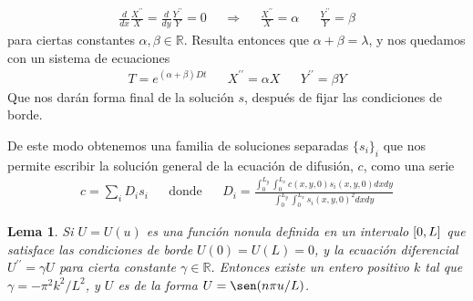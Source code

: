 \documentclass{article}
\newcommand{\realNumbers}{\mathbb{R}}
\newcommand{\leftOpenInterval}{\left]}
\newcommand{\rightOpenInterval}{\right[}
\newcommand{\leftClosedInterval}{\left[}
\newcommand{\rightClosedInterval}{\right]}
\newcommand{\interval}[3]{%
  \ifstrequal{#1}{oo}{%
    \leftOpenInterval #2, #3 \rightOpenInterval%
  }{%
    \ifstrequal{#1}{co}{%
      \leftClosedInterval #2, #3 \rightOpenInterval%
    }{%
      \ifstrequal{#1}{oc}{
        \leftOpenInterval #2, #3 \rightClosedInterval%
      }{%
        \ifstrequal{#1}{cc}{
          \leftClosedInterval #2, #3 \rightClosedInterval
        }{%
        }%
      }%
    }%
  }%
}
\newtheorem{lemma}{Lema}
\begin{document}
  \begin{align}
    \frac{d}{d x} \frac{X^{\prime\prime}}{X} 
    =
    \frac{d}{d y} \frac{Y^{\prime\prime}}{Y}
    =
    0
    &&\Rightarrow
    &&\frac{X^{\prime\prime}}{X} = \alpha
    &&\frac{Y^{\prime\prime}}{Y} = \beta
  \end{align}
  para ciertas constantes \(\alpha, \beta \in \realNumbers\).
  Resulta entonces que \(\alpha + \beta = \lambda\), y nos quedamos con un sistema de ecuaciones
  \begin{align}
    \label{equation:separatedDifussionEquation}
    T = e^{(\alpha + \beta) D t}
    && X^{\prime\prime} = \alpha X
    && Y^{\prime\prime} = \beta Y
  \end{align}
  Que nos darán forma final de la solución \(s\), después de fijar las condiciones de borde.

  De este modo obtenemos una familia de soluciones separadas \(\{s_i\}_i\) que nos permite escribir la solución general de la ecuación de difusión, \(c\), como una serie
  \begin{align}
    c = \sum_i D_i s_i
    &&\text{donde}
    &&D_i = \frac{\int_0^{L_y}\int_0^{L_x} c(x, y, 0) s_i(x, y, 0) d x d y}{\int_0^{L_y}\int_0^{L_x} s_i(x, y, 0)^2 d x d y}
  \end{align}

  \begin{lemma}
    Si \(U = U(u)\) es una función nonula definida en un intervalo \(\interval{cc}{0}{L}\) que satisface las condiciones de borde \(U(0) = U(L) = 0\), y la ecuación diferencial \(U^{\prime\prime} = \gamma U\) para cierta constante \(\gamma \in \realNumbers\).
    Entonces existe un entero positivo \(k\) tal que \(\gamma = - \pi^2 k^2 / L^2\), y \(U\) es de la forma \(U = \sen(n \pi u / L)\).
  \end{lemma}
\end{document}
